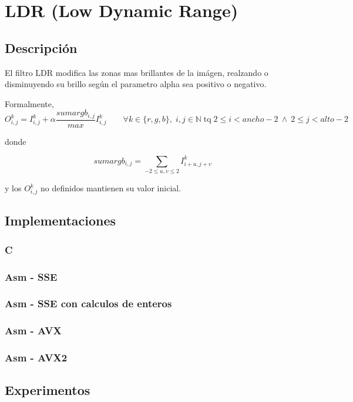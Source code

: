 \section{LDR (Low Dynamic Range)}

\subsection{Descripción}

El filtro LDR modifica las zonas mas brillantes de la imágen, realzando o disminuyendo su brillo según el parametro alpha sea positivo o negativo.

Formalmente,
$$
    O^k_{i,j} = I^k_{i,j} + \alpha \frac{sumargb_{i,j}}{max} I^k_{i,j}
    \qquad \forall k \in \{r,g,b\},\; i,j \in \mathbb{N} \;\text{tq}\; 2 \le i < ancho - 2 \:\land\: 2 \le j < alto - 2
$$

donde

$$
    sumargb_{i,j} = \sum_{-2 \le u,v \le 2} I^k_{i+u, j+v}
$$

y los $O^k_{i,j}$ no definidos mantienen su valor inicial.

\subsection{Implementaciones}

\subsubsection{C}

\subsubsection{Asm - SSE}

\subsubsection{Asm - SSE con calculos de enteros}

\cite{hackersdelight}

\subsubsection{Asm - AVX}

\subsubsection{Asm - AVX2}

\subsection{Experimentos}

